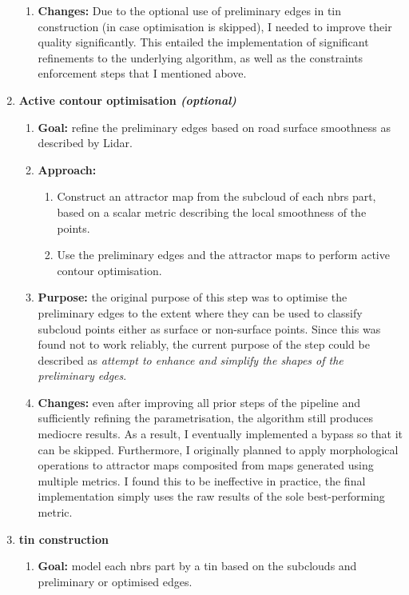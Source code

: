 \begin{enumerate}
\begin{enumerate}
        \item \textbf{Changes:} Due to the optional use of preliminary edges in \ac{tin} construction (in case optimisation is skipped), I needed to improve their quality significantly. This entailed the implementation of significant refinements to the underlying algorithm, as well as the constraints enforcement steps that I mentioned above.
    \end{enumerate}
    \item \textbf{Active contour optimisation \textit{(optional)}}
    \begin{enumerate}
        \item \textbf{Goal:} refine the preliminary edges based on road surface smoothness as described by Lidar.
        \item \textbf{Approach:}
        \begin{enumerate}
            \item Construct an attractor map from the subcloud of each \ac{nbrs} part, based on a scalar metric describing the local smoothness of the points.
            \item Use the preliminary edges and the attractor maps to perform active contour optimisation.
        \end{enumerate}
        \item \textbf{Purpose:} the original purpose of this step was to optimise the preliminary edges to the extent where they can be used to classify subcloud points either as surface or non-surface points. Since this was found not to work reliably, the current purpose of the step could be described as \textit{attempt to enhance and simplify the shapes of the preliminary edges}.
        \item \textbf{Changes:} even after improving all prior steps of the pipeline and sufficiently refining the parametrisation, the algorithm still produces mediocre results. As a result, I eventually implemented a bypass so that it can be skipped. Furthermore, I originally planned to apply morphological operations to attractor maps composited from maps generated using multiple metrics. I found this to be ineffective in practice, the final implementation simply uses the raw results of the sole best-performing metric.
    \end{enumerate}
    \item \textbf{\ac{tin} construction}
    \begin{enumerate}
        \item \textbf{Goal:} model each \ac{nbrs} part by a \ac{tin} based on the subclouds and preliminary or optimised edges.

\end{enumerate}
\end{enumerate}
